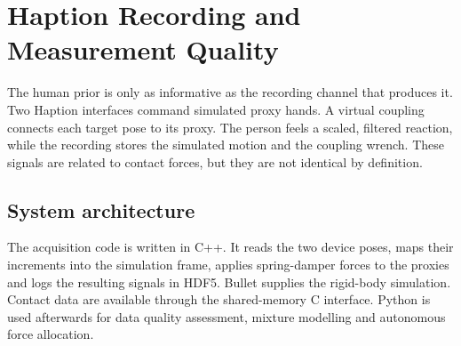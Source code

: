 \chapter{Haption Recording and Measurement Quality}
\label{ch:haption}

The human prior is only as informative as the recording channel that produces it. Two Haption interfaces command simulated proxy hands. A virtual coupling connects each target pose to its proxy. The person feels a scaled, filtered reaction, while the recording stores the simulated motion and the coupling wrench. These signals are related to contact forces, but they are not identical by definition.

\section{System architecture}

The acquisition code is written in C++. It reads the two device poses, maps their increments into the simulation frame, applies spring-damper forces to the proxies and logs the resulting signals in HDF5. Bullet supplies the rigid-body simulation. Contact data are available through the shared-memory C interface. Python is used afterwards for data quality assessment, mixture modelling and autonomous force allocation.

